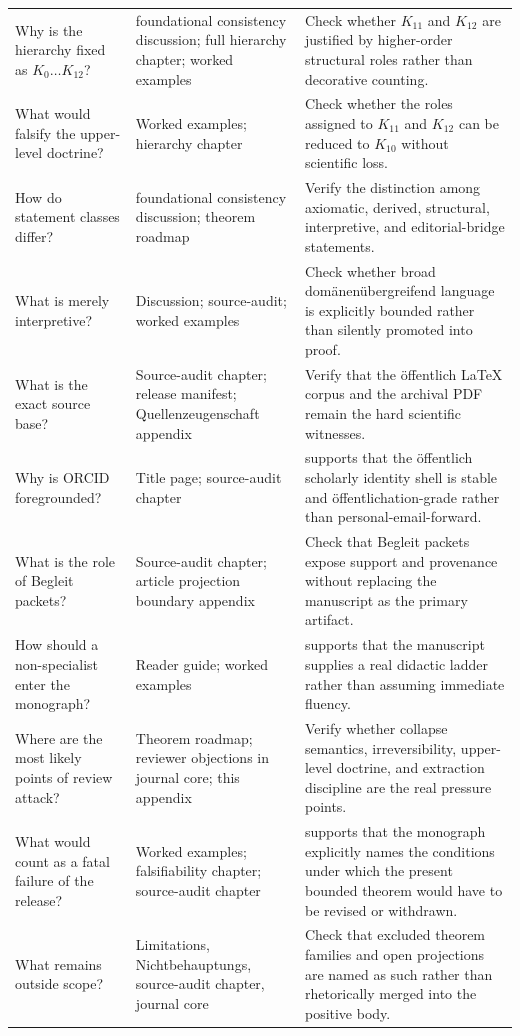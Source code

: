 \begin{longtable}{p{3.4cm} p{4.4cm} p{5.7cm}}
Why is the hierarchy fixed as \(K_0\dots K_{12}\)? & foundational consistency discussion; full hierarchy chapter; worked examples & Check whether \(K_{11}\) and \(K_{12}\) are justified by higher-order structural roles rather than decorative counting. \\
What would falsify the upper-level doctrine? & Worked examples; hierarchy chapter & Check whether the roles assigned to \(K_{11}\) and \(K_{12}\) can be reduced to \(K_{10}\) without scientific loss. \\
How do statement classes differ? & foundational consistency discussion; theorem roadmap & Verify the distinction among axiomatic, derived, structural, interpretive, and editorial-bridge statements. \\
What is merely interpretive? & Discussion; source-audit; worked examples & Check whether broad domänenübergreifend language is explicitly bounded rather than silently promoted into proof. \\
What is the exact source base? & Source-audit chapter; release manifest; Quellenzeugenschaft appendix & Verify that the öffentlich LaTeX corpus and the archival PDF remain the hard scientific witnesses. \\
Why is ORCID foregrounded? & Title page; source-audit chapter & supports that the öffentlich scholarly identity shell is stable and öffentlichation-grade rather than personal-email-forward. \\
What is the role of Begleit packets? & Source-audit chapter; article projection boundary appendix & Check that Begleit packets expose support and provenance without replacing the manuscript as the primary artifact. \\
How should a non-specialist enter the monograph? & Reader guide; worked examples & supports that the manuscript supplies a real didactic ladder rather than assuming immediate fluency. \\
Where are the most likely points of review attack? & Theorem roadmap; reviewer objections in journal core; this appendix & Verify whether collapse semantics, irreversibility, upper-level doctrine, and extraction discipline are the real pressure points. \\
What would count as a fatal failure of the release? & Worked examples; falsifiability chapter; source-audit chapter & supports that the monograph explicitly names the conditions under which the present bounded theorem would have to be revised or withdrawn. \\
What remains outside scope? & Limitations, Nichtbehauptungs, source-audit chapter, journal core & Check that excluded theorem families and open projections are named as such rather than rhetorically merged into the positive body. \\
\end{longtable}

